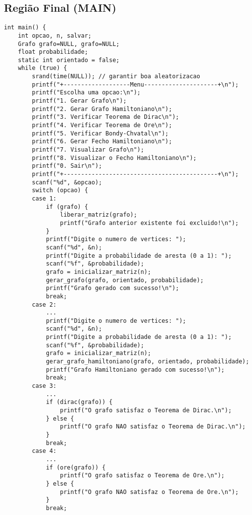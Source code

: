 \documentclass[12pt, openright, oneside, a4paper, chapter=TITLE, section=TITLE, subsection=TITLE, subsubsection=TITLE, brazil]{abntex2}
\newenvironment{codebox}%
  {\begin{mdframed}[backgroundcolor=gray!5, linecolor=gray, roundcorner=5pt]}%
  {\end{mdframed}}
\begin{document}
\subsection{Região Final (MAIN)}
\begin{codebox}
\begin{verbatim}
int main() {
    int opcao, n, salvar;
    Grafo grafo=NULL, grafo=NULL;
    float probabilidade;
    static int orientado = false;
    while (true) {
        srand(time(NULL)); // garantir boa aleatorizacao
        printf("+-------------------Menu---------------------+\n");
        printf("Escolha uma opcao:\n");
        printf("1. Gerar Grafo\n");
        printf("2. Gerar Grafo Hamiltoniano\n");
        printf("3. Verificar Teorema de Dirac\n");
        printf("4. Verificar Teorema de Ore\n");
        printf("5. Verificar Bondy-Chvatal\n");
        printf("6. Gerar Fecho Hamiltoniano\n");
        printf("7. Visualizar Grafo\n");
        printf("8. Visualizar o Fecho Hamiltoniano\n");
        printf("0. Sair\n");
        printf("+--------------------------------------------+\n");
        scanf("%d", &opcao);
        switch (opcao) {
        case 1:
            if (grafo) {
                liberar_matriz(grafo);
                printf("Grafo anterior existente foi excluido!\n");
            }
            printf("Digite o numero de vertices: ");
            scanf("%d", &n);
            printf("Digite a probabilidade de aresta (0 a 1): ");
            scanf("%f", &probabilidade);
            grafo = inicializar_matriz(n);
            gerar_grafo(grafo, orientado, probabilidade);
            printf("Grafo gerado com sucesso!\n");
            break;
        case 2:
            ...
            printf("Digite o numero de vertices: ");
            scanf("%d", &n);
            printf("Digite a probabilidade de aresta (0 a 1): ");
            scanf("%f", &probabilidade);
            grafo = inicializar_matriz(n);
            gerar_grafo_hamiltoniano(grafo, orientado, probabilidade);
            printf("Grafo Hamiltoniano gerado com sucesso!\n");
            break;
        case 3:
            ...
            if (dirac(grafo)) {
                printf("O grafo satisfaz o Teorema de Dirac.\n");
            } else {
                printf("O grafo NAO satisfaz o Teorema de Dirac.\n");
            }
            break;
        case 4:
            ...
            if (ore(grafo)) {
                printf("O grafo satisfaz o Teorema de Ore.\n");
            } else {
                printf("O grafo NAO satisfaz o Teorema de Ore.\n");
            }
            break;

\end{verbatim}
\end{codebox}
\end{document}
